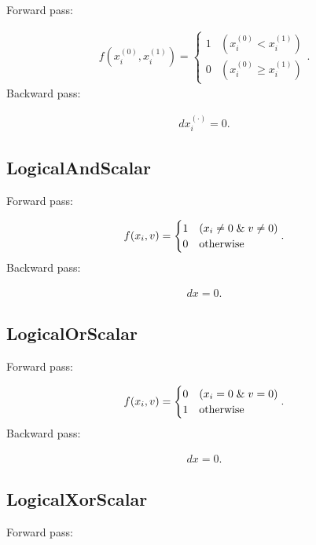 \documentclass{article}
\begin{document}
Forward pass:

\begin{eqnarray}
  f(x^{(0)}_i,x^{(1)}_i) = \begin{cases}
    1  & (x^{(0)}_i < x^{(1)}_i) \\
    0 & (x^{(0)}_i \geq x^{(1)}_i)
  \end{cases}.
\end{eqnarray}
%
Backward pass:

\begin{eqnarray}
  dx^{(\cdot)}_i = 0.
\end{eqnarray}

\subsection{LogicalAndScalar}

Forward pass:

\begin{eqnarray}
  f(x_i,v) = \begin{cases}
    1 & (x_i \neq 0 \;\&\; v \neq 0) \\
    0 & {\rm otherwise}
  \end{cases}.
\end{eqnarray}
%
Backward pass:

\begin{eqnarray}
  dx = 0.
\end{eqnarray}

\subsection{LogicalOrScalar}

Forward pass:

\begin{eqnarray}
  f(x_i,v) = \begin{cases}
    0 & (x_i = 0 \;\&\; v = 0) \\
    1 & {\rm otherwise}
  \end{cases}.
\end{eqnarray}
%
Backward pass:

\begin{eqnarray}
  dx = 0.
\end{eqnarray}

\subsection{LogicalXorScalar}

Forward pass:
\end{document}
